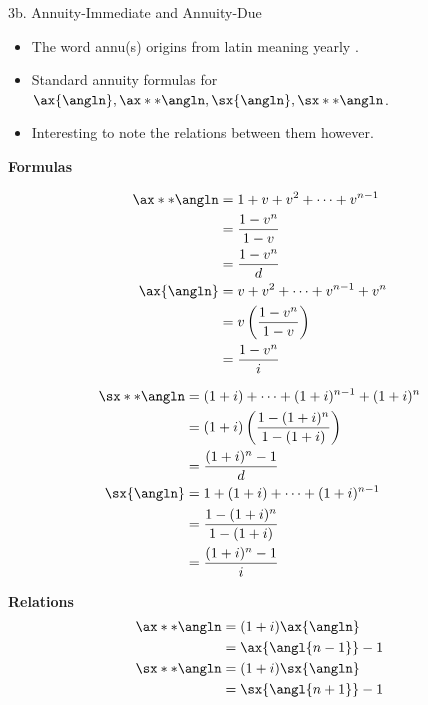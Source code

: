 \begin{CHPT_SUMM_AUTO}[label = {L.-3b}]{3b. Annuity-Immediate and Annuity-Due}
	\begin{itemize}[leftmargin = *]
		\item	The word annu(s) origins from latin meaning \og yearly \fg{}.
		\item	Standard annuity formulas for $\ax{\angln}, \ax**{\angln}, \sx{\angln}, \sx**{\angln}$.
		\item	Interesting to note the relations between them however.
	\end{itemize}
\setlength{\mathindent}{-1cm}

\textbf{Formulas}

	\begin{minipage}[ht]{0.4\linewidth}
	\begin{align*}
	\ax**{\angln}	
	&=	1 + v + v^{2} + \dots + v^{n - 1}	\\
	&=	\frac{1 - v^{n}}{1 - v}	\\
	&=	\frac{1 - v^{n}}{d}	\\
	\ax{\angln}	
	&=	v + v^{2} + \dots + v^{n - 1} + v^{n}	\\
	&=	v\left(\frac{1 - v^{n}}{1 - v}\right)	\\
	&=	\frac{1 - v^{n}}{i}	
	\end{align*}	
	\end{minipage}
	\begin{minipage}[ht]{0.6\linewidth}
		\begin{align*}
	\sx**{\angln}	
	&=	(1 + i) + \dots + (1 + i)^{n - 1} + (1 + i)^{n}	\\	
	&=	(1 + i)\left(\frac{1 - (1 + i)^{n}}{1 - (1 + i)}\right)	\\
	&=	\frac{(1 + i)^{n} - 1}{d}	\\
	\sx{\angln}	
	&=	1 + (1 + i) + \dots + (1 + i)^{n - 1}	\\
	&=	\frac{1 - (1 + i)^{n}}{1 - (1 + i)}	\\
	&=	\frac{(1 + i)^{n} - 1}{i}	
	\end{align*}
	\end{minipage}

\textbf{Relations}
	\begin{align*}
	\ax**{\angln}	
	&=	(1 + i) \ax{\angln}	\\
	&=	\ax{\angl{n - 1}} - 1	\\
	\sx**{\angln}	
	&=	(1 + i) \sx{\angln}	\\
	&=	\sx{\angl{n + 1}} - 1	
	\end{align*}
	\setlength{\mathindent}{1cm}
\end{CHPT_SUMM_AUTO}

